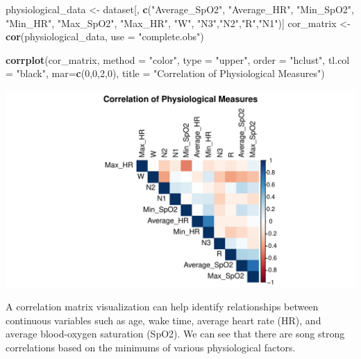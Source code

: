 \documentclass[
]{article}
\newenvironment{Shaded}{\begin{snugshade}}{\end{snugshade}}
\newcommand{\AttributeTok}[1]{\textcolor[rgb]{0.13,0.29,0.53}{#1}}
\newcommand{\DecValTok}[1]{\textcolor[rgb]{0.00,0.00,0.81}{#1}}
\newcommand{\FunctionTok}[1]{\textcolor[rgb]{0.13,0.29,0.53}{\textbf{#1}}}
\newcommand{\NormalTok}[1]{#1}
\newcommand{\OtherTok}[1]{\textcolor[rgb]{0.56,0.35,0.01}{#1}}
\newcommand{\StringTok}[1]{\textcolor[rgb]{0.31,0.60,0.02}{#1}}
\begin{document}
\begin{Shaded}
\begin{Highlighting}[]
\NormalTok{physiological\_data }\OtherTok{\textless{}{-}}\NormalTok{ dataset[, }\FunctionTok{c}\NormalTok{(}\StringTok{"Average\_SpO2"}\NormalTok{, }\StringTok{"Average\_HR"}\NormalTok{, }\StringTok{"Min\_SpO2"}\NormalTok{, }\StringTok{"Min\_HR"}\NormalTok{, }\StringTok{"Max\_SpO2"}\NormalTok{, }\StringTok{"Max\_HR"}\NormalTok{, }\StringTok{"W"}\NormalTok{, }\StringTok{"N3"}\NormalTok{,}\StringTok{"N2"}\NormalTok{,}\StringTok{"R"}\NormalTok{,}\StringTok{"N1"}\NormalTok{)]}
\NormalTok{cor\_matrix }\OtherTok{\textless{}{-}} \FunctionTok{cor}\NormalTok{(physiological\_data, }\AttributeTok{use =} \StringTok{"complete.obs"}\NormalTok{)}

\FunctionTok{corrplot}\NormalTok{(cor\_matrix, }\AttributeTok{method =} \StringTok{"color"}\NormalTok{, }\AttributeTok{type =} \StringTok{"upper"}\NormalTok{, }\AttributeTok{order =} \StringTok{"hclust"}\NormalTok{,}
         \AttributeTok{tl.col =} \StringTok{"black"}\NormalTok{, }\AttributeTok{mar=}\FunctionTok{c}\NormalTok{(}\DecValTok{0}\NormalTok{,}\DecValTok{0}\NormalTok{,}\DecValTok{2}\NormalTok{,}\DecValTok{0}\NormalTok{),}
         \AttributeTok{title =} \StringTok{"Correlation of Physiological Measures"}\NormalTok{)}
\end{Highlighting}
\end{Shaded}

\includegraphics{602_project_files/figure-latex/unnamed-chunk-14-1.pdf}

A correlation matrix visualization can help identify relationships
between continuous variables such as age, wake time, average heart rate
(HR), and average blood-oxygen saturation (SpO2). We can see that there
are song strong correlations based on the minimums of various
physiological factors.
\end{document}
